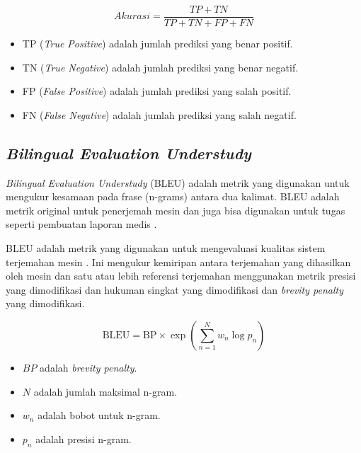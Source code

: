 \begin{equation}
    Akurasi = \frac{TP + TN}{TP + TN + FP + FN}
    \label{rumus-accuracy}
\end{equation}

\begin{itemize}
    \item TP (\textit{True Positive}) adalah jumlah prediksi yang benar positif.
    \item TN (\textit{True Negative}) adalah jumlah prediksi yang benar negatif.
    \item FP (\textit{False Positive}) adalah jumlah prediksi yang salah positif.
    \item FN (\textit{False Negative}) adalah jumlah prediksi yang salah negatif.

\end{itemize}

\subsection{\textit{Bilingual Evaluation Understudy}}

\par \textit{Bilingual Evaluation Understudy} (BLEU) adalah metrik yang digunakan untuk mengukur kesamaan pada frase (n-grams) antara dua kalimat. BLEU adalah metrik original untuk penerjemah mesin dan juga bisa digunakan untuk tugas seperti pembuatan laporan medis \citep{li2021ffa}.

\par BLEU adalah metrik yang digunakan untuk mengevaluasi kualitas sistem terjemahan mesin \citep{papineni2002bleu}. Ini mengukur kemiripan antara terjemahan yang dihasilkan oleh mesin dan satu atau lebih referensi terjemahan menggunakan metrik presisi yang dimodifikasi dan hukuman singkat yang dimodifikasi dan \textit{brevity penalty} yang dimodifikasi.

\begin{equation}
    \text{BLEU} = \text{BP} \times \exp\left(\sum_{n=1}^{N} w_n \log p_n\right) 
    \label{rumus-bleu}
\end{equation}



\begin{itemize}
    \item $BP$ adalah \textit{brevity penalty}.
    \item $N$ adalah jumlah maksimal n-gram.
    \item $w_n$ adalah bobot untuk n-gram.
    \item $p_n$ adalah presisi n-gram.

\end{itemize}

